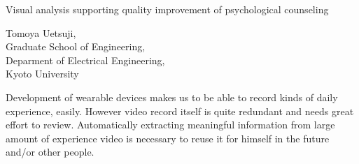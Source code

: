 \begin{flushleft}
\Large
Visual analysis supporting quality improvement of psychological counseling
\end{flushleft}
\begin{flushright}
Tomoya Uetsuji, \\
Graduate School of Engineering, \\
Deparment of Electrical Engineering,\\
Kyoto University
\end{flushright}
\hspace{20zw}
Development of wearable devices makes us to be able to record kinds of daily experience, easily. However video record itself is quite redundant and needs great effort to review. Automatically extracting meaningful information from large amount of experience video is necessary to reuse it for himself in the future and/or other people.
